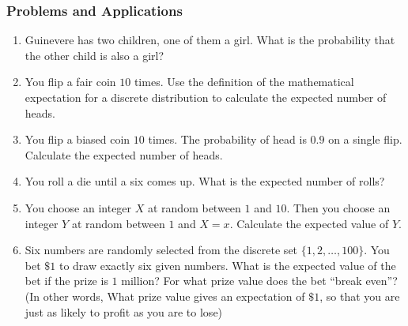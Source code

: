 

\begin{frame}
\frametitle{Problems and Applications}
\begin{enumerate}
\item Guinevere has two children, one of them a girl. What is the probability that the other child is also a girl?
\item You flip a fair coin $10$ times. Use the definition of the mathematical expectation for a discrete distribution to calculate the expected number of heads. 
\item You flip a biased coin $10$ times. The probability of head is $0.9$ on a single flip. Calculate the expected number of heads.
\item You roll a die until a six comes up. What is the expected number of rolls?
\item You choose an integer $X$ at random between $1$ and $10$. Then you choose an integer $Y$ at random between $1$ and $X=x$. Calculate the expected value of $Y$. 
\item Six numbers are randomly selected from the discrete set $\{1,2,\ldots,100\}$. You bet $\$1$ to draw exactly six given numbers. What is the expected value of the bet if the prize is $1$ million? For what prize value does the bet ``break even''? (In other words, What prize value gives an expectation of $\$1$, so that you are just as likely to profit as you are to lose)
\end{enumerate}
\end{frame}

